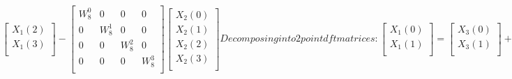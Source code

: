 \documentclass[journal,12pt,twocolumn]{IEEEtran}
\renewcommand\thesection{\arabic{section}}
\begin{document}
\begin{enumerate}[label=\arabic*.,ref=\thesection.\theenumi]
\begin{solution}
$$\begin{equation}
\begin{bmatrix}
	X_1(2) \\
	X_1(3) \\
\end{bmatrix}
-
\begin{bmatrix}
	W_8^{0} & 0 & 0 & 0\\ 
	0 & W_8^{1} & 0 & 0 \\
	0 & 0 & W_8^{2} & 0 \\
	0 & 0 & 0 & W_8^{3} \\
\end{bmatrix}
\begin{bmatrix}
	X_2(0) \\ 
	X_2(1) \\
	X_2(2) \\
	X_2(3) \\
\end{bmatrix}
\end{equation}
Decomposing into 2 point dft matrices:
\begin{equation}
	\begin{bmatrix}
	X_{1}(0) \\ 
	X_{1}(1)\\ 
	\end{bmatrix}
	=
	\begin{bmatrix}
	X_{3}(0) \\ 
	X_{3}(1)\\ 
	\end{bmatrix}
	+
	\begin{bmatrix}
	W^{0}_{4} & 0\\
	0 & W^{1}_{4}
	\end{bmatrix}
	\begin{bmatrix}
	X_{4}(0) \\ 
	X_{4}(1) \\ 
	\end{bmatrix}
	\end{equation}
	\begin{equation}
	\begin{bmatrix}
	X_{1}(2) \\ 
	X_{1}(3)\\ 
	\end{bmatrix}
	=
	\begin{bmatrix}
	X_{3}(0) \\ 
	X_{3}(1)\\ 
	\end{bmatrix}
	-
	\begin{bmatrix}
	W^{0}_{4} & 0\\
	0 & W^{1}_{4}
	\end{bmatrix}
	\begin{bmatrix}

\end{bmatrix}
\end{equation}$$
\end{solution}
\end{enumerate}
\end{document}
